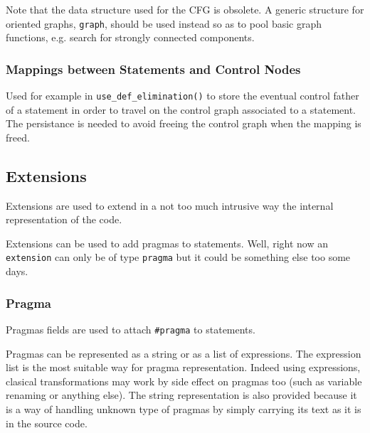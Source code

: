 \documentclass[a4paper]{article}
\begin{document}
Note that the data structure used for the CFG is obsolete. A generic
structure for oriented graphs, \verb/graph/, should be used instead so
as to pool basic graph functions, e.g. search for strongly connected
components.


\subsubsection{Mappings between Statements and Control Nodes}

{}

{}

Used for example in \verb/use_def_elimination()/ to store the eventual
control father of a statement in order to travel on the control graph
associated to a statement. The persistance is needed to avoid freeing
the control graph when the mapping is freed.


\subsection{Extensions}
\label{sec:extensions}

{}

Extensions are used to extend in a not too much intrusive way the internal
representation of the code.

{}

Extensions can be used to add pragmas to statements. Well, right now an
\texttt{extension} can only be of type \texttt{pragma} but it could be
something else too some days.


\subsubsection{Pragma}
\label{sec:pragma}

{}

Pragmas fields are used to attach \verb|#pragma| to statements.

Pragmas can be represented as a string or as a list of expressions.
The expression list is the most suitable way for pragma representation.
Indeed using expressions, clasical transformations may work by side effect
on pragmas too (such as variable renaming or anything else). The string
representation is also provided because it is a way of handling
unknown type of pragmas by simply carrying its text as it is in the source
code.
\end{document}
